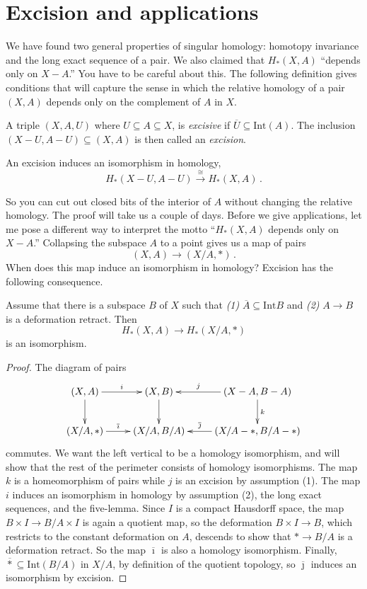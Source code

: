 \section{Excision and applications}
We have found two general properties of singular homology: homotopy invariance and the long exact sequence of a pair. We also claimed that $H_\ast(X,A)$ ``depends only on $X-A$.'' You have to be careful about this. The following definition gives conditions that will capture the sense in which the relative homology of a pair $(X,A)$ depends only on the complement of $A$ in $X$. 
\begin{definition}
A triple $(X,A,U)$ where $U\subseteq A\subseteq X$, is \emph{excisive} if $\overline{U}\subseteq\mathrm{Int}(A)$. 
The inclusion $(X-U,A-U)\subseteq (X,A)$ is then called an {\em excision}.
\end{definition}

\begin{theorem}
An excision induces an isomorphism in homology,
\[
H_\ast(X-U,A-U)\xrightarrow{\cong}H_\ast(X,A)\,.
\]
\end{theorem}
So you can cut out closed bits of the interior of $A$ without changing the relative homology. The proof will take us a couple of days. Before we give applications, let me pose a different way to interpret the motto ``$H_*(X,A)$ depends only on $X-A$.'' Collapsing the subspace $A$ to a point gives us a map of pairs
\[
(X,A)\to(X/A,\ast)\,.
\]
When does this map induce an isomorphism in homology? Excision has the following consequence.
\begin{corollary} Assume that there is a subspace $B$ of $X$ such that 
{\em(1)} $\overline A\subseteq\mathrm{Int}B$ and 
{\em(2)} $A\to B$ is a deformation retract.
Then 
\[
H_*(X,A)\to H_*(X/A,*)
\]
is an isomorphism. 
\end{corollary}
\begin{proof} 
The diagram of pairs
\[
\xymatrix{
(X,A) \ar[d] \ar[r]^-i & (X,B) \ar[d] & (X-A,B-A) \ar[d]^k \ar[l]_-j \\
(X/A,\ast) \ar[r]^-{\overline\imath} & (X/A,B/A) & 
(X/A-\ast,B/A-\ast) \ar[l]_-{\overline\jmath} 
}\]
commutes. We want the left vertical to be a homology isomorphism, and
will show that the rest of the perimeter consists of homology isomorphisms.  
The map $k$ is a homeomorphism of pairs while $j$ is an excision by assumption
(1). The map $i$ induces an isomorphism in homology by assumption (2),
the long exact sequences, and the five-lemma.
Since $I$ is a compact Hausdorff space, the map $B\times I\to B/A\times I$
is again a quotient map, so the deformation $B\times I\to B$, which restricts
to the constant deformation on $A$, descends to show that $\ast\to B/A$ 
is a deformation retract. So the map $\overline\imath$ 
is also a homology isomorphism. 
Finally, $\overline\ast\subseteq\mathrm{Int}(B/A)$ in $X/A$, by definition
of the quotient topology, so $\overline\jmath$ induces an isomorphism by
excision. 
\end{proof}

